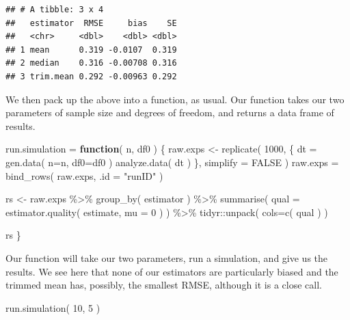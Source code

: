 \documentclass[
]{book}
\newenvironment{Shaded}{\begin{snugshade}}{\end{snugshade}}
\newcommand{\AttributeTok}[1]{\textcolor[rgb]{0.77,0.63,0.00}{#1}}
\newcommand{\ConstantTok}[1]{\textcolor[rgb]{0.00,0.00,0.00}{#1}}
\newcommand{\ControlFlowTok}[1]{\textcolor[rgb]{0.13,0.29,0.53}{\textbf{#1}}}
\newcommand{\DecValTok}[1]{\textcolor[rgb]{0.00,0.00,0.81}{#1}}
\newcommand{\FunctionTok}[1]{\textcolor[rgb]{0.00,0.00,0.00}{#1}}
\newcommand{\NormalTok}[1]{#1}
\newcommand{\OtherTok}[1]{\textcolor[rgb]{0.56,0.35,0.01}{#1}}
\newcommand{\SpecialCharTok}[1]{\textcolor[rgb]{0.00,0.00,0.00}{#1}}
\newcommand{\StringTok}[1]{\textcolor[rgb]{0.31,0.60,0.02}{#1}}
\begin{document}
\begin{verbatim}
## # A tibble: 3 x 4
##   estimator  RMSE     bias    SE
##   <chr>     <dbl>    <dbl> <dbl>
## 1 mean      0.319 -0.0107  0.319
## 2 median    0.316 -0.00708 0.316
## 3 trim.mean 0.292 -0.00963 0.292
\end{verbatim}

We then pack up the above into a function, as usual.
Our function takes our two parameters of sample size and degrees of freedom, and returns a data frame of results.

\begin{Shaded}
\begin{Highlighting}[]
\NormalTok{run.simulation }\OtherTok{=} \ControlFlowTok{function}\NormalTok{( n, df0 ) \{}
\NormalTok{    raw.exps }\OtherTok{\textless{}{-}} \FunctionTok{replicate}\NormalTok{( }\DecValTok{1000}\NormalTok{, \{}
\NormalTok{        dt }\OtherTok{=} \FunctionTok{gen.data}\NormalTok{( }\AttributeTok{n=}\NormalTok{n, }\AttributeTok{df0=}\NormalTok{df0 )}
        \FunctionTok{analyze.data}\NormalTok{( dt )}
\NormalTok{    \}, }\AttributeTok{simplify =} \ConstantTok{FALSE}\NormalTok{ )}
\NormalTok{    raw.exps }\OtherTok{=} \FunctionTok{bind\_rows}\NormalTok{( raw.exps, }\AttributeTok{.id =} \StringTok{"runID"}\NormalTok{ )}

\NormalTok{    rs }\OtherTok{\textless{}{-}}\NormalTok{ raw.exps }\SpecialCharTok{\%\textgreater{}\%}
        \FunctionTok{group\_by}\NormalTok{( estimator ) }\SpecialCharTok{\%\textgreater{}\%}
        \FunctionTok{summarise}\NormalTok{( }\AttributeTok{qual =} \FunctionTok{estimator.quality}\NormalTok{( estimate, }\AttributeTok{mu =} \DecValTok{0}\NormalTok{ ) ) }\SpecialCharTok{\%\textgreater{}\%}
\NormalTok{        tidyr}\SpecialCharTok{::}\FunctionTok{unpack}\NormalTok{( }\AttributeTok{cols=}\FunctionTok{c}\NormalTok{( qual ) )}

\NormalTok{    rs}
\NormalTok{\}}
\end{Highlighting}
\end{Shaded}

Our function will take our two parameters, run a simulation, and give us the
results. We see here that none of our estimators are particularly biased and
the trimmed mean has, possibly, the smallest RMSE, although it is a close
call.

\begin{Shaded}
\begin{Highlighting}[]
\FunctionTok{run.simulation}\NormalTok{( }\DecValTok{10}\NormalTok{, }\DecValTok{5}\NormalTok{ )}
\end{Highlighting}
\end{Shaded}
\end{document}
